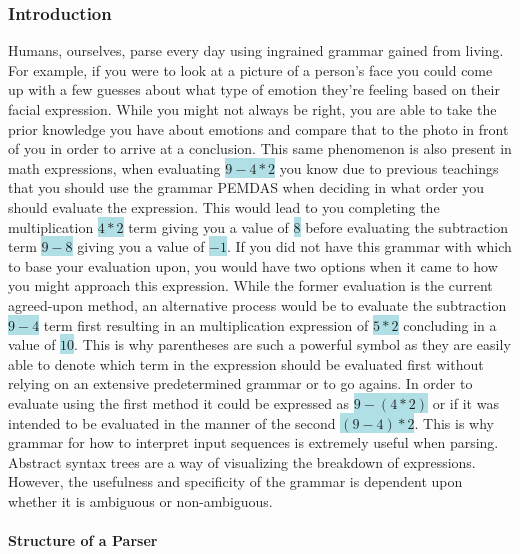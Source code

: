 \documentclass{article}
\begin{document}
\subsubsection{Introduction}

Humans, ourselves, parse every day using ingrained grammar gained from living. For example, if you were to look at a picture of a person's face you could come up with a few guesses about what type of emotion they're feeling based on their facial expression. While you might not always be right, you are able to take the prior knowledge you have about emotions and compare that to the photo in front of you in order to arrive at a conclusion. This same phenomenon is also present in math expressions, when evaluating \colorbox{powderblue} {$9 -  4 * 2$} you know due to previous teachings that you should use the grammar PEMDAS when deciding in what order you should evaluate the expression. This would lead to you completing the multiplication \colorbox{powderblue} {$4 * 2$} term giving you a value of \colorbox{powderblue} {$8$} before evaluating the subtraction term \colorbox{powderblue} {$9 -  8$} giving you a value of \colorbox{powderblue} {$-1$}. If you did not have this grammar with which to base your evaluation upon, you would have two options when it came to how you might approach this expression. While the former evaluation is the current agreed-upon method, an alternative process would be to evaluate the subtraction \colorbox{powderblue} {$9 -  4$} term first resulting in an multiplication expression of \colorbox{powderblue} {$5 * 2$} concluding in a value of \colorbox{powderblue} {$10$}. This is why parentheses are such a powerful symbol as they are easily able to denote which term in the expression should be evaluated first without relying on an extensive predetermined grammar or to go agains. In order to evaluate using the first method it could be expressed as \colorbox{powderblue} {$9 -  (4 * 2)$} or if it was intended to be evaluated in the manner of the second \colorbox{powderblue} {$(9 -  4) * 2$}. This is why grammar for how to interpret input sequences is extremely useful when parsing. Abstract syntax trees are a way of visualizing the breakdown of expressions. However, the usefulness and specificity of the grammar is dependent upon whether it is ambiguous or non-ambiguous.

\paragraph{Structure of a Parser}
\end{document}
